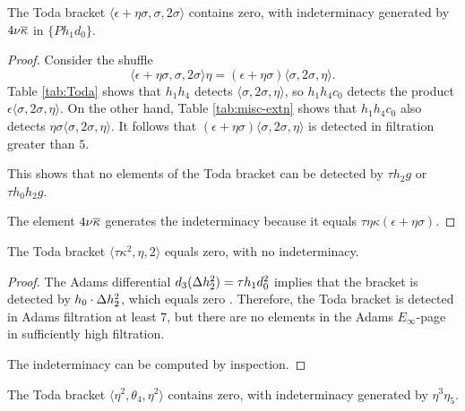 \begin{lemma}
\label{lem:nubar,sigma,2sigma}
The Toda bracket
$\langle \epsilon + \eta \sigma, \sigma, 2 \sigma \rangle$
contains zero, with indeterminacy generated
by $4 \nu \overline{\kappa}$ in $\{ P h_1 d_0 \}$.
\end{lemma}

\begin{proof}
Consider the shuffle
\[
\langle \epsilon + \eta \sigma, \sigma, 2 \sigma \rangle \eta =
(\epsilon + \eta \sigma) \langle \sigma, 2 \sigma, \eta \rangle.
\]
Table \ref{tab:Toda} shows that $h_1 h_4$ detects
$\langle \sigma, 2 \sigma, \eta \rangle$, so
$h_1 h_4 c_0$ detects the product
$\epsilon \langle \sigma, 2 \sigma, \eta \rangle$.
On the other hand, Table \ref{tab:misc-extn} shows that
$h_1 h_4 c_0$ also detects 
$\eta \sigma \langle \sigma, 2 \sigma, \eta \rangle$.
It follows that
$(\epsilon + \eta \sigma) \langle \sigma, 2 \sigma, \eta \rangle$
is detected in filtration greater than $5$.

This shows that no elements of the Toda bracket
can be detected by $\tau h_2 g$ or $\tau h_0 h_2 g$.

The element $4 \nu \overline{\kappa}$ generates the indeterminacy
because it equals $\tau \eta \kappa (\epsilon + \eta \sigma)$.
\end{proof}

\begin{lemma}
\label{lem:tkappa^2,eta,2}
The Toda bracket $\langle \tau \kappa^2, \eta, 2 \rangle$
equals zero, with no indeterminacy.
\end{lemma}

\begin{proof}
The Adams differential $d_3(\Delta h_2^2) = \tau h_1 d_0^2$
implies that the bracket is detected by $h_0 \cdot \Delta h_2^2$,
which equals zero .  
Therefore, the Toda bracket is detected 
in Adams filtration at least $7$, but there are no 
elements in the Adams $E_\infty$-page in sufficiently high
filtration.

The indeterminacy can be computed by inspection.
\end{proof}

\begin{lemma}
\label{lem:eta^2,theta4,eta^2}
The Toda bracket $\langle \eta^2, \theta_4, \eta^2 \rangle$
contains zero, with indeterminacy generated by
$\eta^3 \eta_5$.
\end{lemma}


